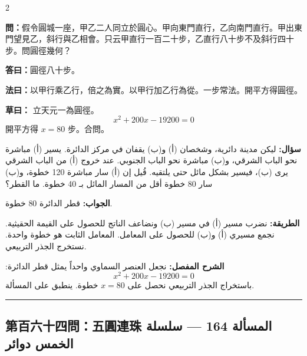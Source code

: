 \documentclass[11pt,a4paper]{article}
\newcommand{\ar}[1]{\arabicfont\beginR #1\endR}
\newcommand{\arb}[1]{\textbf{\arabicfont\beginR #1\endR}}
\newcommand{\longline}{\noindent\rule{\textwidth}{0.4pt}}
\newcommand{\arnote}[1]{\textcolor{arabicblue}{\ar{#1}}}
\newcommand{\wen}[1]{\par\noindent\textbf{\textcolor{probcolor}{問：}}{#1}\par}
\newcommand{\da}[1]{\par\noindent\textbf{\textcolor{anscolor}{答曰：}}{#1}\par}
\newcommand{\fayue}[1]{\par\noindent\textbf{\textcolor{methodcolor}{法曰：}}{#1}\par}
\newcommand{\caoyue}[1]{\par\noindent\textbf{草曰：}{#1}\par}
\newcommand{\arwen}[1]{\par\noindent\arb{سؤال: }\arnote{#1}\par}
\newcommand{\arjwb}[1]{\par\noindent\arb{الجواب: }\arnote{#1}\par}
\newcommand{\arqwd}[1]{\par\noindent\arb{الطريقة: }\arnote{#1}\par}
\newcommand{\arshr}[1]{\par\noindent\arb{الشرح المفصل: }\arnote{#1}\par}
\begin{document}
\begin{paracol}{2}

\begin{leftcolumn}
\wen{假令圓城一座，甲乙二人同立於圓心。甲向東門直行，乙向南門直行。甲出東門望見乙，斜行與乙相會。只云甲直行一百二十步，乙直行八十步不及斜行四十步。問圓徑幾何？}

\da{圓徑八十步。}

\fayue{以甲行乘乙行，倍之為實。以甲行加乙行為從。一步常法。開平方得圓徑。}

\caoyue{
立天元一為圓徑。
$$x^2 + 200x - 19200 = 0$$
開平方得 $x = 80$ 步。合問。}
\end{leftcolumn}

\begin{rightcolumn}
\arwen{ليكن مدينة دائرية، وشخصان (أ) و(ب) يقفان في مركز الدائرة. يسير (أ) مباشرة نحو الباب الشرقي، و(ب) مباشرة نحو الباب الجنوبي. عند خروج (أ) من الباب الشرقي يرى (ب)، فيسير بشكل مائل حتى يلتقيه. قُيل إن (أ) سار مباشرة 120 خطوة، و(ب) سار 80 خطوة أقل من المسار المائل بـ 40 خطوة. ما القطر؟}

\arjwb{قطر الدائرة 80 خطوة.}

\arqwd{نضرب مسير (أ) في مسير (ب) ونضاعف الناتج للحصول على القيمة الحقيثية. نجمع مسيري (أ) و(ب) للحصول على المعامل. المعامل الثابت هو خطوة واحدة. نستخرج الجذر التربيعي.}

\arshr{نجعل العنصر السماوي واحداً يمثل قطر الدائرة:
$$x^2 + 200x - 19200 = 0$$
باستخراج الجذر التربيعي نحصل على $x = 80$ خطوة. ينطبق على المسألة.}
\end{rightcolumn}

\end{paracol}

\vspace{0.3cm}
\longline

\subsection*{第百六十四問：五圓連珠 \hfill \ar{المسألة 164 — سلسلة الخمس دوائر}}
\end{document}
